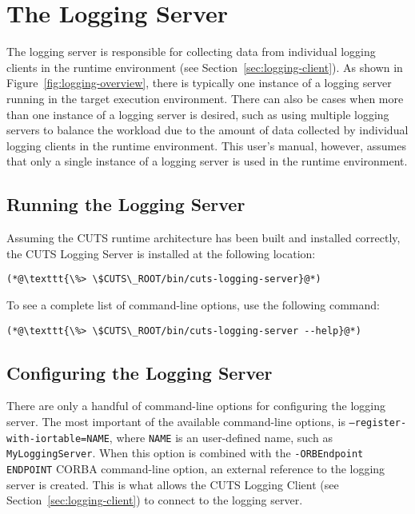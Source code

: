 \section{The Logging Server}
\label{sec:logging-server}

The logging server is responsible for collecting data from individual 
logging clients in the runtime environment (see Section~\ref{sec:logging-client}).
As shown in Figure~\ref{fig:logging-overview}, there is typically 
one instance of a logging server running in the target execution 
environment. There can also be cases when more than one instance of a 
logging server is desired, such as using multiple logging servers to 
balance the workload due to the amount of data collected by individual
logging clients in the runtime environment. This user's manual, however, 
assumes that only a single instance of a logging server is used in the 
runtime environment.

\subsection{Running the Logging Server}

Assuming the CUTS runtime architecture has been built and installed 
correctly, the CUTS Logging Server is installed at the following 
location:
\begin{lstlisting}
(*@\texttt{\%> \$CUTS\_ROOT/bin/cuts-logging-server}@*)
\end{lstlisting}
To see a complete list of command-line options, use the following 
command:
\begin{lstlisting}
(*@\texttt{\%> \$CUTS\_ROOT/bin/cuts-logging-server --help}@*)
\end{lstlisting}

\subsection{Configuring the Logging Server}

There are only a handful of command-line options for configuring the
logging server. The most important of the available command-line options,
is \texttt{--register-with-iortable=NAME}, where \texttt{NAME} 
is an user-defined name, such as \texttt{MyLoggingServer}. When this 
option is combined with the \texttt{-ORBEndpoint ENDPOINT} CORBA 
command-line option, an external reference to the logging server is 
created. This is what allows the CUTS Logging Client (see 
Section~\ref{sec:logging-client}) to connect to the logging server.

